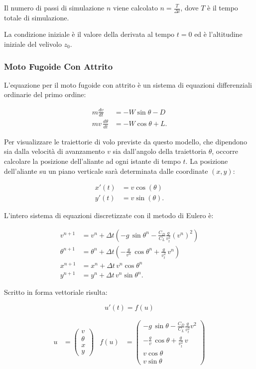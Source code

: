 \noindent
Il numero di passi di simulazione $n$ viene calcolato $n = \frac{T}{\Delta t}$, dove $T$ è il
tempo totale di simulazione.

\noindent 
La condizione iniziale è il valore della derivata al tempo $t=0$ ed è l'altitudine iniziale del velivolo $z_0$.

\subsubsection*{Moto Fugoide Con Attrito}
L’equazione per il moto fugoide con attrito è un sistema di equazioni differenziali ordinarie del primo ordine: 

\begin{align}
m \frac{dv}{dt} & = - W \sin\theta - D \\
m v \, \frac{d\theta}{dt} & = - W \cos\theta + L.
\end{align}

\noindent
Per visualizzare le traiettorie di volo previste da questo modello, che dipendono sia dalla velocità di avanzamento $v$ sia dall’angolo della traiettoria $\theta$, occorre calcolare la posizione dell'aliante ad ogni istante di tempo $t$. La posizione dell’aliante su un piano verticale sarà determinata dalle coordinate $(x,y)$: 

\begin{align}
x'(t) & = v \cos(\theta) \\
y'(t) & = v \sin(\theta).
\end{align}

\noindent
L’intero sistema di equazioni discretizzate con il metodo di Eulero è:

\begin{align}
v^{n+1} & = v^n + \Delta t \left(- g\, \sin\theta^n - \frac{C_D}{C_L} \frac{g}{v_t^2} (v^n)^2 \right) \\
\theta^{n+1} & = \theta^n + \Delta t \left(- \frac{g}{v^n}\,\cos\theta^n + \frac{g}{v_t^2}\, v^n \right) \\
x^{n+1} & = x^n + \Delta t \, v^n \cos\theta^n \\
y^{n+1} & = y^n + \Delta t \, v^n \sin\theta^n.
\end{align}

\noindent
Scritto in forma vettoriale risulta: 

$$u'(t) = f(u)$$

\begin{align}
u & = \begin{pmatrix} v \\ \theta \\ x \\ y \end{pmatrix} & f(u) & = \begin{pmatrix} - g\, \sin\theta - \frac{C_D}{C_L} \frac{g}{v_t^2} v^2 \\ - \frac{g}{v}\,\cos\theta + \frac{g}{v_t^2}\, v \\ v\cos\theta \\ v\sin\theta \end{pmatrix}
\end{align}

